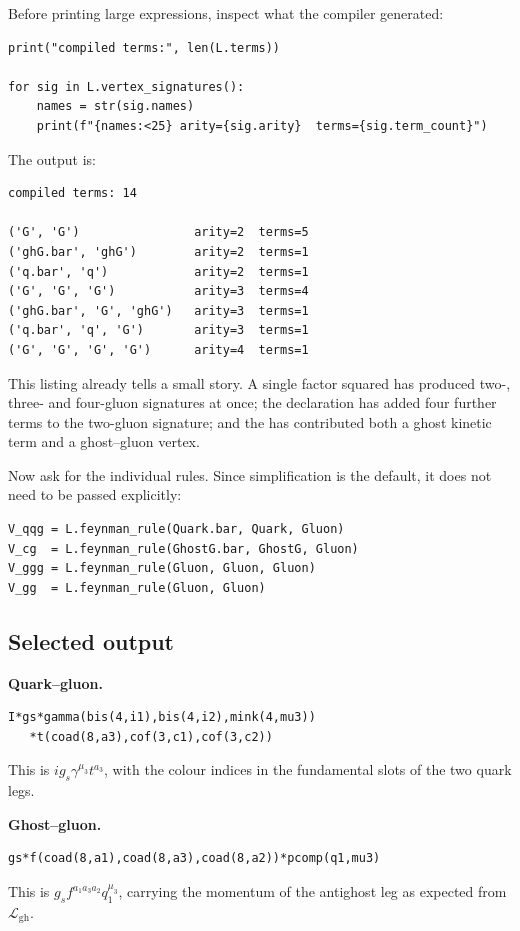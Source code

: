 \noindent Before printing large expressions, inspect what the compiler
generated:

\begin{verbatim}
print("compiled terms:", len(L.terms))

for sig in L.vertex_signatures():
    names = str(sig.names)
    print(f"{names:<25} arity={sig.arity}  terms={sig.term_count}")
\end{verbatim}

\noindent The output is:

\begin{verbatim}
compiled terms: 14

('G', 'G')                arity=2  terms=5
('ghG.bar', 'ghG')        arity=2  terms=1
('q.bar', 'q')            arity=2  terms=1
('G', 'G', 'G')           arity=3  terms=4
('ghG.bar', 'G', 'ghG')   arity=3  terms=1
('q.bar', 'q', 'G')       arity=3  terms=1
('G', 'G', 'G', 'G')      arity=4  terms=1
\end{verbatim}

\noindent This listing already tells a small story. A single  factor
squared has produced two-, three- and four-gluon signatures at once; the
 declaration has added four further terms to the two-gluon
signature; and the  has contributed both a ghost kinetic
term and a ghost--gluon vertex.

\noindent Now ask for the individual rules. Since simplification is the
default, it does not need to be passed explicitly:

\begin{verbatim}
V_qqg = L.feynman_rule(Quark.bar, Quark, Gluon)
V_cg  = L.feynman_rule(GhostG.bar, GhostG, Gluon)
V_ggg = L.feynman_rule(Gluon, Gluon, Gluon)
V_gg  = L.feynman_rule(Gluon, Gluon)
\end{verbatim}

\subsection*{Selected output}

\noindent\textbf{Quark--gluon.}
\begin{verbatim}
I*gs*gamma(bis(4,i1),bis(4,i2),mink(4,mu3))
   *t(coad(8,a3),cof(3,c1),cof(3,c2))
\end{verbatim}
\noindent This is $i g_s \gamma^{\mu_3}t^{a_3}$, with the colour indices in
the fundamental slots of the two quark legs.

\noindent\textbf{Ghost--gluon.}
\begin{verbatim}
gs*f(coad(8,a1),coad(8,a3),coad(8,a2))*pcomp(q1,mu3)
\end{verbatim}
\noindent This is $g_s f^{a_1a_3a_2}q_1^{\mu_3}$, carrying the momentum of the
antighost leg as expected from $\mathcal{L}_{\mathrm{gh}}$.

